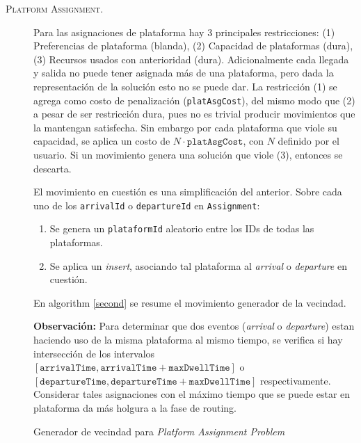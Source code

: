 \documentclass[letter, 10pt]{article}
\begin{document}
\begin{description}
    \item[\textsc{Platform Assignment.}] Para las asignaciones de plataforma hay $3$ principales restricciones: (1) Preferencias de plataforma (blanda), (2) Capacidad de plataformas (dura), (3) Recursos usados con anterioridad (dura). Adicionalmente cada llegada y salida no puede tener asignada más de una plataforma, pero dada la representación de la solución esto no se puede dar. La restricción (1) se agrega como costo de penalización (\texttt{platAsgCost}), del mismo modo que (2) a pesar de ser restricción dura, pues no es trivial producir movimientos que la mantengan satisfecha. Sin embargo por cada plataforma que viole su capacidad, se aplica un costo de $N \cdot \texttt{platAsgCost}$, con $N$ definido por el usuario. Si un movimiento genera una solución que viole (3), entonces se descarta.

    El movimiento en cuestión es una simplificación del anterior. Sobre cada uno de los \texttt{arrivalId} o \texttt{departureId} en \texttt{Assignment}:
    \begin{enumerate}
           \item Se genera un \texttt{plataformId} aleatorio entre los IDs de todas las plataformas.
           \item Se aplica un \textit{insert}, asociando tal plataforma al \textit{arrival} o \textit{departure} en cuestión.
    \end{enumerate}
    En algorithm \ref{second} se resume el movimiento generador de la vecindad.

    \textbf{Observación:} Para determinar que dos eventos (\textit{arrival} o \textit{departure}) estan haciendo uso de la misma plataforma al mismo tiempo, se verifica si hay intersección de los intervalos $[\texttt{arrivalTime},\texttt{arrivalTime}+\texttt{maxDwellTime}]$ o $[\texttt{departureTime},\texttt{departureTime}+\texttt{maxDwellTime}]$ respectivamente. Considerar tales asignaciones con el máximo tiempo que se puede estar en plataforma da más holgura a la fase de routing.
\begin{algorithm}
\caption{Generador de vecindad para \textit{Platform Assignment Problem}}\label{second}
\begin{algorithmic}[1]
\EndIf
{}
\EndFor
\EndProcedure
\end{algorithmic}
\end{algorithm}



\end{description}
\end{document}
